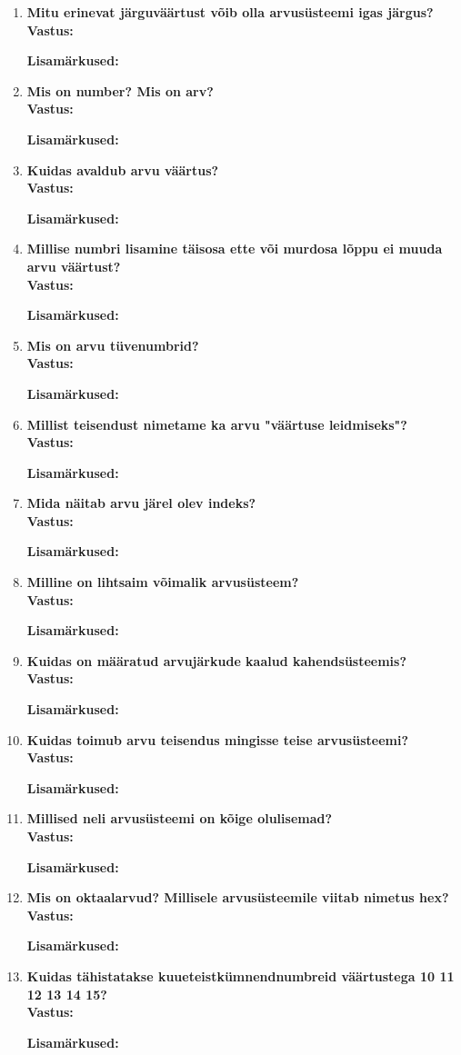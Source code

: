 \documentclass[a4paper,12pt]{article}
\makeatletter
\newenvironment{question}[1]{%
  \item \textbf{#1} \vspace{0.5em} \\ %
  \textbf{Vastus:} \vspace{0.25em} \\ %
  \def\@lisamarkused{} %
}{%
  \if\relax\detokenize\expandafter{\@lisamarkused}\relax %
  \else
    \vspace{0.5em} %
    \textbf{Lisamärkused:} \\ %
    \@lisamarkused %
  \fi
  \vspace{1em} %
}
\makeatother
\begin{document}
\begin{enumerate}[left=0pt]
\begin{question}{Mitu erinevat järguväärtust võib olla arvusüsteemi igas järgus?}
\end{question}

\begin{question}{Mis on number? Mis on arv?}
\end{question}

\begin{question}{Kuidas avaldub arvu väärtus?}
\end{question}

\begin{question}{Millise numbri lisamine täisosa ette või murdosa lõppu ei muuda arvu väärtust?}
\end{question}

\begin{question}{Mis on arvu tüvenumbrid?}
\end{question}

\begin{question}{Millist teisendust nimetame ka arvu "väärtuse leidmiseks"?}
\end{question}

\begin{question}{Mida näitab arvu järel olev indeks?}
\end{question}

\begin{question}{Milline on lihtsaim võimalik arvusüsteem?}
\end{question}

\begin{question}{Kuidas on määratud arvujärkude kaalud kahendsüsteemis?}
\end{question}

\begin{question}{Kuidas toimub arvu teisendus mingisse teise arvusüsteemi?}
\end{question}

\begin{question}{Millised neli arvusüsteemi on kõige olulisemad?}
\end{question}

\begin{question}{Mis on oktaalarvud? Millisele arvusüsteemile viitab nimetus hex?}
\end{question}

\begin{question}{Kuidas tähistatakse kuueteistkümnendnumbreid väärtustega 10 11 12 13 14 15?}
\end{question}


\end{enumerate}
\end{document}
